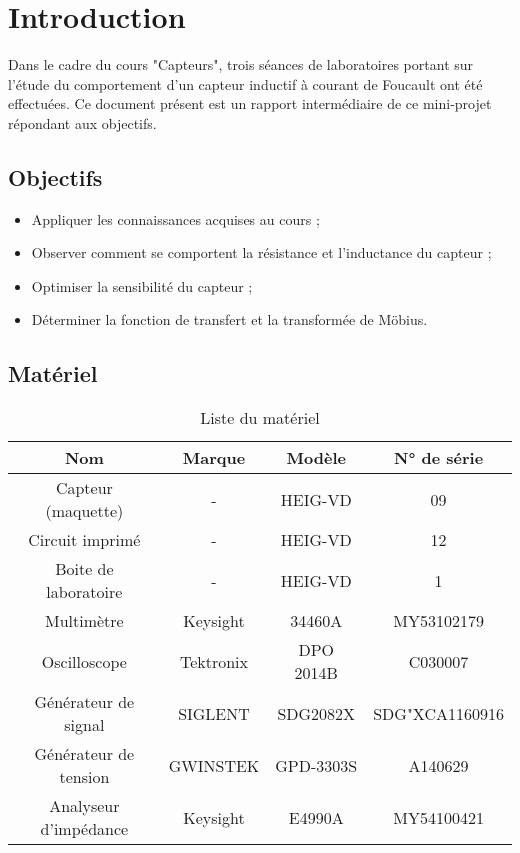 

\section{Introduction}

Dans le cadre du cours "Capteurs", trois séances de laboratoires portant
sur l'étude du comportement d'un capteur inductif à courant de Foucault ont été effectuées. 
Ce document présent est un rapport intermédiaire de ce mini-projet répondant aux objectifs.

\subsection{Objectifs}

\begin{itemize}
    \item Appliquer les connaissances acquises au cours ;
    \item Observer comment se comportent la résistance et l'inductance du capteur ;
    \item Optimiser la sensibilité du capteur ;
    \item Déterminer la fonction de transfert et la transformée de Möbius. 
\end{itemize}

\subsection{Matériel}

\begin{table}[H]
    \centering
    \begin{tabular}{|c|c|c|c|}
    \hline
    \textbf{Nom}          & \textbf{Marque} & \textbf{Modèle} & \textbf{N° de série} \\ \hline
    Capteur (maquette)    & -               & HEIG-VD         & 09                   \\ \hline
    Circuit imprimé       & -               & HEIG-VD         & 12                   \\ \hline
    Boite de laboratoire  & -               & HEIG-VD         & 1                    \\ \hline
    Multimètre            & Keysight        & 34460A          & MY53102179           \\ \hline
    Oscilloscope          & Tektronix       & DPO 2014B       & C030007              \\ \hline
    Générateur de signal  & SIGLENT         & SDG2082X        & SDG"XCA1160916       \\ \hline
    Générateur de tension & GWINSTEK        & GPD-3303S       & A140629              \\ \hline
    Analyseur d'impédance & Keysight        & E4990A          & MY54100421           \\ \hline
    \end{tabular}
    \caption{Liste du matériel}
    \end{table}





    

